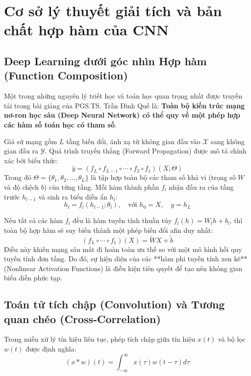 \documentclass[12pt,a4paper]{article}
\begin{document}
\newpage

\section{Cơ sở lý thuyết giải tích và bản chất hợp hàm của CNN}

\subsection{Deep Learning dưới góc nhìn Hợp hàm (Function Composition)}
Một trong những nguyên lý triết học và toán học quan trọng nhất được truyền tải trong bài giảng của PGS.TS. Trần Đình Quế là: \textbf{Toàn bộ kiến trúc mạng nơ-ron học sâu (Deep Neural Network) có thể quy về một phép hợp các hàm số toán học có tham số}.

Giả sử mạng gồm $L$ tầng biến đổi, ánh xạ từ không gian đầu vào $\mathcal{X}$ sang không gian đầu ra $\mathcal{Y}$. Quá trình truyền thẳng (Forward Propagation) được mô tả chính xác bởi biểu thức:
\begin{equation}
    \hat{y} = (f_L \circ f_{L-1} \circ \cdots \circ f_2 \circ f_1)(X; \Theta)
    \label{eq:function_composition}
\end{equation}
Trong đó $\Theta = \{\theta_1, \theta_2, \dots, \theta_L\}$ là tập hợp toàn bộ các tham số khả vi (trọng số $W$ và độ chệch $b$) của từng tầng. Mỗi hàm thành phần $f_l$ nhận đầu ra của tầng trước $h_{l-1}$ và sinh ra biểu diễn ẩn $h_l$:
\begin{equation}
    h_l = f_l(h_{l-1}; \theta_l), \quad \text{với } h_0 = X, \quad \hat{y} = h_L
\end{equation}

Nếu tất cả các hàm $f_l$ đều là hàm tuyến tính thuần túy $f_l(h) = W_l h + b_l$, thì toàn bộ hợp hàm sẽ suy biến thành một phép biến đổi afin duy nhất:
\begin{equation}
    (f_L \circ \cdots \circ f_1)(X) = \tilde{W} X + \tilde{b}
\end{equation}
Điều này khiến mạng sâu mất đi hoàn toàn ưu thế so với một mô hình hồi quy tuyến tính đơn tầng. Do đó, sự hiện diện của các **hàm phi tuyến tính xen kẽ** (Nonlinear Activation Functions) là điều kiện tiên quyết để tạo nên không gian biểu diễn phức tạp.

\subsection{Toán tử tích chập (Convolution) và Tương quan chéo (Cross-Correlation)}
Trong miền xử lý tín hiệu liên tục, phép tích chập giữa tín hiệu $x(t)$ và bộ lọc $w(t)$ được định nghĩa:
\begin{equation}
    (x * w)(t) = \int_{-\infty}^{\infty} x(\tau) w(t - \tau) d\tau
\end{equation}
\end{document}

